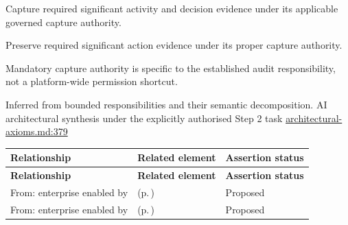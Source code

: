 
Capture required significant activity and decision evidence under its applicable governed capture authority.



Preserve required significant action evidence under its proper capture authority.



Mandatory capture authority is specific to the established audit responsibility, not a platform-wide permission shortcut.


Inferred from bounded responsibilities and their semantic decomposition. AI architectural synthesis under the explicitly authorised Step 2 task \hyperref[evidence:27549d51551beae6]{architectural-axioms.md:379}
\begingroup\small\setlength{\TableWidth}{\dimexpr\linewidth-6\tabcolsep-4\arrayrulewidth\relax}
\begin{longtable}{|>{\raggedright\arraybackslash}p{0.27\TableWidth}|>{\raggedright\arraybackslash}p{0.48\TableWidth}|>{\raggedright\arraybackslash}p{0.25\TableWidth}|}
\hline\rowcolor{TableHead}\textbf{Relationship} & \textbf{Related element} & \textbf{Assertion status}\\\hline\endfirsthead
\hline\rowcolor{TableHead}\textbf{Relationship} & \textbf{Related element} & \textbf{Assertion status}\\\hline\endhead
\hline\endfoot
From: enterprise enabled by & \nameref{cap:bec-health-information-control} (p.\,\pageref{cap:bec-health-information-control}) & Proposed\\\hline
From: enterprise enabled by & \nameref{cap:bec-clinical-communication-administration} (p.\,\pageref{cap:bec-clinical-communication-administration}) & Proposed\\\hline
\end{longtable}\endgroup

